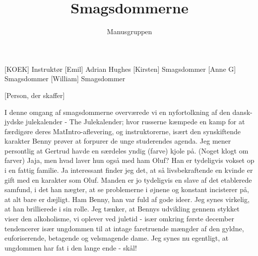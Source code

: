 \documentclass[a4paper,11pt]{article}
\title{Smagsdommerne}
\author{Manusgruppen}
\begin{document}
\maketitle

\begin{roles}
[KOEK] Instruktør
[Emil] Adrian Hughes
[Kirsten] Smagsdommer
[Anne G] Smagsdommer
[William] Smagsdommer
\end{roles}

\begin{props}
[Person, der skaffer]
\end{props}


\begin{sketch}
 I denne omgang af smagsdommerne overværede vi en nyfortolkning af den dansk-jydske julekalender - The Julekalender; hvor russerne kæmpede en kamp for at færdigøre deres MatIntro-aflevering, og instruktorerne, isært den synskiftende karakter Benny prøver at forpurer de unge studerendes agenda.
 Jeg mener persontlig at Gertrud havde en særdeles yndig (farve) kjole på.
 (Noget klogt om farver)
 Jaja, men hvad laver hun også med ham Oluf? Han er tydeligvis vokset op i en fattig familie.
 Ja interessant finder jeg det, at så livsbekraftende en kvinde er gift med en karakter som Oluf. Manden er jo tydeligvis en slave af det etablerede samfund, i det han nægter, at se problemerne i øjnene og konstant incisterer på, at alt bare er dæjligt.
 Ham Benny, han var fuld af gode ideer. Jeg synes virkelig, at han brillierede i sin rolle.
 Jeg tænker, at Bennys udvikling gennem stykket viser den alkoholisme, vi oplever ved juletid - især omkring første december tendencerer især ungdommen til at intage faretruende mængder af den gyldne, euforiserende, betagende og velsmagende dame.
 Jeg synes nu egentligt, at ungdommen har fat i den lange ende - skål!

\end{sketch}
\end{document}
